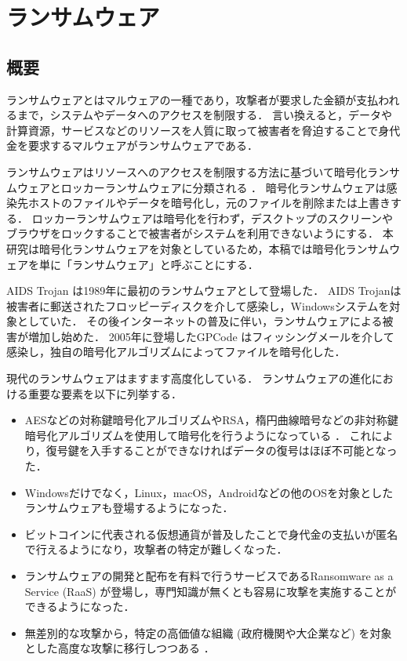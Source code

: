 \chapter{ランサムウェア}





\section{概要}
\label{sec:ransom-overview}
ランサムウェアとはマルウェアの一種であり，攻撃者が要求した金額が支払われるまで，システムやデータへのアクセスを制限する．
言い換えると，データや計算資源，サービスなどのリソースを人質に取って被害者を脅迫することで身代金を要求するマルウェアがランサムウェアである．

ランサムウェアはリソースへのアクセスを制限する方法に基づいて暗号化ランサムウェアとロッカーランサムウェアに分類される \cite{oz2022survey}．
暗号化ランサムウェアは感染先ホストのファイルやデータを暗号化し，元のファイルを削除または上書きする．
ロッカーランサムウェアは暗号化を行わず，デスクトップのスクリーンやブラウザをロックすることで被害者がシステムを利用できないようにする．
本研究は暗号化ランサムウェアを対象としているため，本稿では暗号化ランサムウェアを単に「ランサムウェア」と呼ぶことにする．

AIDS Trojan \cite{aids-trojan} は1989年に最初のランサムウェアとして登場した．
AIDS Trojanは被害者に郵送されたフロッピーディスクを介して感染し，Windowsシステムを対象としていた．
その後インターネットの普及に伴い，ランサムウェアによる被害が増加し始めた．
2005年に登場したGPCode \cite{PGPCoder42:online} はフィッシングメールを介して感染し，独自の暗号化アルゴリズムによってファイルを暗号化した．

現代のランサムウェアはますます高度化している．
ランサムウェアの進化における重要な要素を以下に列挙する．
\begin{itemize}
  \item AESなどの対称鍵暗号化アルゴリズムやRSA，楕円曲線暗号などの非対称鍵暗号化アルゴリズムを使用して暗号化を行うようになっている \cite{Evolution-Ransomware}．
        これにより，復号鍵を入手することができなければデータの復号はほぼ不可能となった．

  \item Windowsだけでなく，Linux，macOS，Androidなどの他のOSを対象としたランサムウェアも登場するようになった．

  \item ビットコインに代表される仮想通貨が普及したことで身代金の支払いが匿名で行えるようになり，攻撃者の特定が難しくなった．

  \item ランサムウェアの開発と配布を有料で行うサービスであるRansomware as a Service (RaaS) が登場し，専門知識が無くとも容易に攻撃を実施することができるようになった．

  \item 無差別的な攻撃から，特定の高価値な組織 (政府機関や大企業など) を対象とした高度な攻撃に移行しつつある \cite{early-detection}．

\end{itemize}

